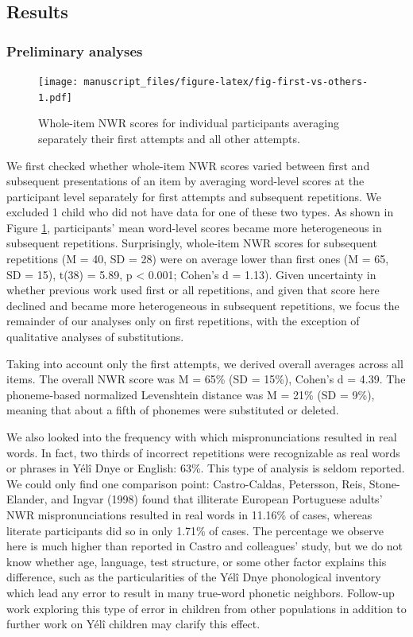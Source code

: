 \documentclass[english,,man,floatsintext]{apa6}
\begin{document}
\hypertarget{results}{%
\subsection{Results}\label{results}}

\hypertarget{preliminary-analyses}{%
\subsubsection{Preliminary analyses}\label{preliminary-analyses}}

\begin{figure}
\centering
\texttt{[image: manuscript\_files/figure-latex/fig-first-vs-others-1.pdf]}
\caption{\label{fig:fig-first-vs-others}Whole-item NWR scores for individual participants averaging separately their first attempts and all other attempts.}
\end{figure}

We first checked whether whole-item NWR scores varied between first and subsequent presentations of an item by averaging word-level scores at the participant level separately for first attempts and subsequent repetitions. We excluded 1 child who did not have data for one of these two types. As shown in Figure \ref{fig:fig-first-vs-others}, participants' mean word-level scores became more heterogeneous in subsequent repetitions. Surprisingly, whole-item NWR scores for subsequent repetitions (M = 40, SD = 28)
were on average lower than first ones (M = 65, SD = 15), t(38) = 5.89, p \textless{} 0.001; Cohen's d = 1.13). Given uncertainty in whether previous work used first or all repetitions, and given that score here declined and became more heterogeneous in subsequent repetitions, we focus the remainder of our analyses only on first repetitions, with the exception of qualitative analyses of substitutions.

Taking into account only the first attempts, we derived overall averages across all items. The overall NWR score was M = 65\% (SD = 15\%), Cohen's d = 4.39. The phoneme-based normalized Levenshtein distance was M = 21\% (SD = 9\%), meaning that about a fifth of phonemes were substituted or deleted.

We also looked into the frequency with which mispronunciations resulted in real words. In fact, two thirds of incorrect repetitions were recognizable as real words or phrases in Yélî Dnye or English: 63\%. This type of analysis is seldom reported. We could only find one comparison point: Castro-Caldas, Petersson, Reis, Stone-Elander, and Ingvar (1998) found that illiterate European Portuguese adults' NWR mispronunciations resulted in real words in 11.16\% of cases, whereas literate participants did so in only 1.71\% of cases. The percentage we observe here is much higher than reported in Castro and colleagues' study, but we do not know whether age, language, test structure, or some other factor explains this difference, such as the particularities of the Yélî Dnye phonological inventory which lead any error to result in many true-word phonetic neighbors. Follow-up work exploring this type of error in children from other populations in addition to further work on Yélî children may clarify this effect.
\end{document}
